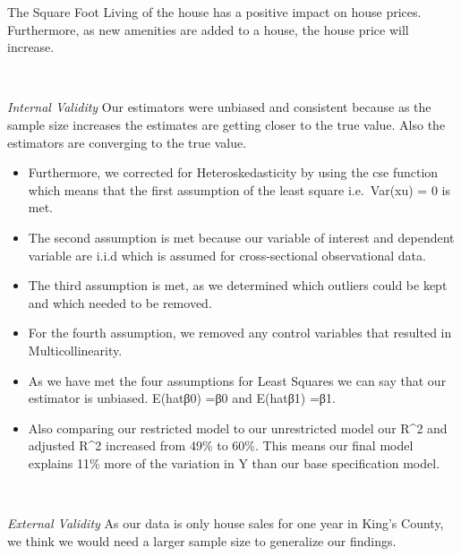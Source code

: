 \documentclass[
]{article}
\begin{document}
The Square Foot Living of the house has a positive impact on house
prices. Furthermore, as new amenities are added to a house, the house
price will increase.

~

\emph{Internal Validity} Our estimators were unbiased and consistent
because as the sample size increases the estimates are getting closer to
the true value. Also the estimators are converging to the true value.

\begin{itemize}
\item
  Furthermore, we corrected for Heteroskedasticity by using the cse
  function which means that the first assumption of the least square
  i.e.~Var(x\textbar u) = 0 is met.
\item
  The second assumption is met because our variable of interest and
  dependent variable are i.i.d which is assumed for cross-sectional
  observational data.
\item
  The third assumption is met, as we determined which outliers could be
  kept and which needed to be removed.
\item
  For the fourth assumption, we removed any control variables that
  resulted in Multicollinearity.
\item
  As we have met the four assumptions for Least Squares we can say that
  our estimator is unbiased. E(hatβ0) =β0 and E(hatβ1) =β1.
\item
  Also comparing our restricted model to our unrestricted model our
  R\^{}2 and adjusted R\^{}2 increased from 49\% to 60\%. This means our
  final model explains 11\% more of the variation in Y than our base
  specification model.
\end{itemize}

~

\emph{External Validity} As our data is only house sales for one year in
King's County, we think we would need a larger sample size to generalize
our findings.
\end{document}
